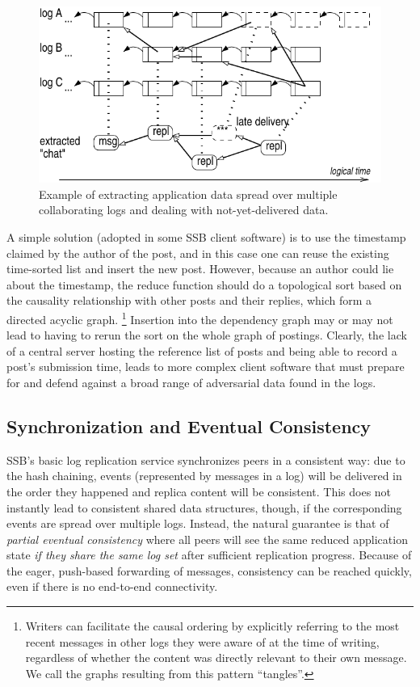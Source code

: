 \documentclass[9pt,sigconf]{acmart}
\begin{document}
\begin{figure}[htb]
  \includegraphics[width=0.9\columnwidth]{figs/tangle.pdf}
  \caption{Example of extracting application data spread over multiple
    collaborating logs and dealing with not-yet-delivered data.}
  \label{fig:tangle}
\end{figure}

A simple solution (adopted in some SSB client software) is to use the
timestamp claimed by the author of the post, and in this case one can
reuse the existing time-sorted list and insert the new post. However,
because an author could lie about the timestamp, the reduce function
should do a topological sort based on the causality relationship with
other posts and their replies, which form a directed acyclic graph.%
%
\footnote{Writers can facilitate the causal ordering by explicitly
  referring to the most recent messages in other logs they were aware
  of at the time of writing, regardless of whether the content was
  directly relevant to their own message. We call the graphs resulting
  from this pattern ``tangles''.}
%
Insertion into the dependency graph
may or may not lead to having to rerun the sort on the whole graph of
postings. Clearly, the lack of a central server hosting the reference
list of posts and being able to record a post's submission time, leads
to more complex client software that must prepare for and defend
against a broad range of adversarial data found in the logs.


\subsection{Synchronization and Eventual Consistency}
\label{Section:Tangle}

SSB's basic log replication service synchronizes peers in a consistent
way: due to the hash chaining, events (represented by messages in a
log) will be delivered in the order they happened and replica content
will be consistent. This does not instantly lead to consistent shared
data structures, though, if the corresponding events are spread over
multiple logs. Instead, the natural guarantee is that of {\em partial
  eventual consistency} where all peers will see the same reduced
application state {\em if they share the same log set} after
sufficient replication progress. Because of the eager, push-based
forwarding of messages, consistency can be reached quickly, even if
there is no end-to-end connectivity.
\end{document}

